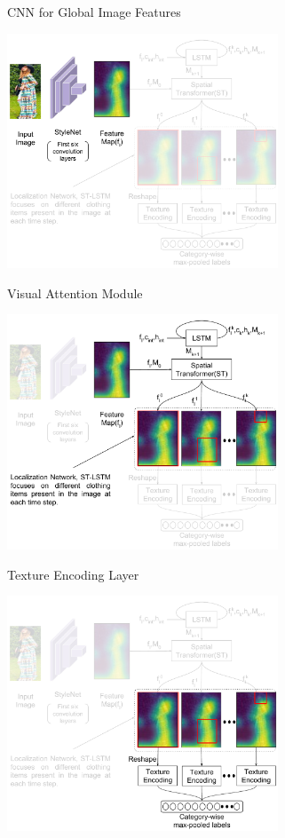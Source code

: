 \documentclass[handout]{beamer}
\begin{document}
\begin{frame}{CNN for Global Image Features}
  \vspace{-1cm}
    \begin{center}
      \includegraphics[width=0.8\linewidth, height=7cm]{images/staqu_st_ten_arch_cnn}
    \end{center}
\end{frame}

\begin{frame}{Visual Attention Module}
  \vspace{-1cm}
    \begin{center}
      \includegraphics[width=0.8\linewidth, height=7cm]{images/staqu_st_ten_arch_attn}
    \end{center}
\end{frame}

\begin{frame}{Texture Encoding Layer}
\vspace{-1cm}
  \begin{center}
    \includegraphics[width=0.8\linewidth, height=7cm]{images/staqu_st_ten_arch_text}
  \end{center}
\end{frame}
\end{document}
